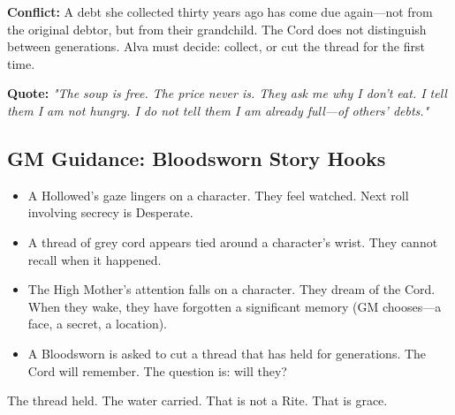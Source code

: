 \textbf{Conflict:} A debt she collected thirty years ago has come due again—not from the original debtor, but from their grandchild. The Cord does not distinguish between generations. Alva must decide: collect, or cut the thread for the first time.

\textbf{Quote:} \textit{"The soup is free. The price never is. They ask me why I don't eat. I tell them I am not hungry. I do not tell them I am already full—of others' debts."}

\subsection{GM Guidance: Bloodsworn Story Hooks}

\begin{itemize}
\item A Hollowed's gaze lingers on a character. They feel watched. Next roll involving secrecy is Desperate.
\item A thread of grey cord appears tied around a character's wrist. They cannot recall when it happened.
\item The High Mother's attention falls on a character. They dream of the Cord. When they wake, they have forgotten a significant memory (GM chooses—a face, a secret, a location).
\item A Bloodsworn is asked to cut a thread that has held for generations. The Cord will remember. The question is: will they?
\end{itemize}

The thread held. The water carried. That is not a Rite. That is grace.
